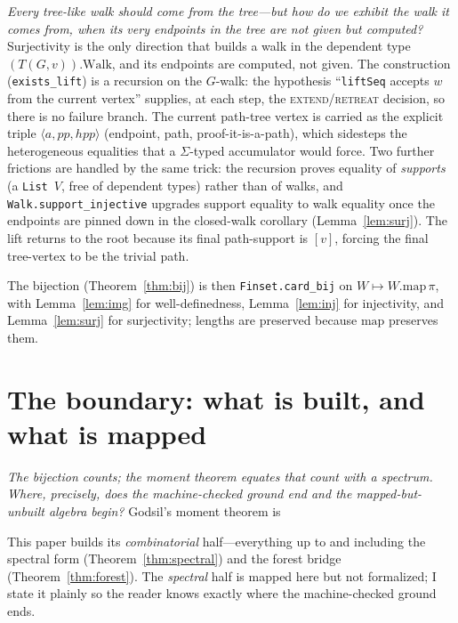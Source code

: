 \documentclass[11pt]{article}
\newcommand{\lean}[1]{\texttt{#1}}
\newcommand{\keyeq}[1]{\begin{center}\keybox{$\displaystyle #1$}\end{center}}
\begin{document}
\emph{Every tree-like walk should come from the tree---but how do we exhibit the walk it comes from,
when its very endpoints in the tree are not given but computed?} Surjectivity is the only direction
that builds a walk in the dependent type
$(T(G,v)).\mathrm{Walk}$, and its endpoints are computed, not given. The construction
(\lean{exists\_lift}) is a recursion on the $G$-walk: the hypothesis ``\lean{liftSeq} accepts $w$ from
the current vertex'' supplies, at each step, the \textsc{extend}/\textsc{retreat} decision, so there
is no failure branch. The current path-tree vertex is carried as the explicit triple
$\langle a, pp, hpp\rangle$ (endpoint, path, proof-it-is-a-path), which sidesteps the heterogeneous
equalities that a $\Sigma$-typed accumulator would force. Two further frictions are handled by the
same trick: the recursion proves equality of \emph{supports} (a \lean{List}~$V$, free of dependent
types) rather than of walks, and \lean{Walk.support\_injective} upgrades support equality to walk
equality once the endpoints are pinned down in the closed-walk corollary
(Lemma~\ref{lem:surj}). The lift returns to the root because its final path-support is $[v]$, forcing
the final tree-vertex to be the trivial path.

The bijection (Theorem~\ref{thm:bij}) is then \lean{Finset.card\_bij} on $W\mapsto W.\mathrm{map}\,\pi$,
with Lemma~\ref{lem:img} for well-definedness, Lemma~\ref{lem:inj} for injectivity, and
Lemma~\ref{lem:surj} for surjectivity; lengths are preserved because $\mathrm{map}$ preserves them.

\section{The boundary: what is built, and what is mapped}
\label{sec:boundary}

\emph{The bijection counts; the moment theorem equates that count with a spectrum. Where, precisely,
does the machine-checked ground end and the mapped-but-unbuilt algebra begin?} Godsil's moment theorem
is
\keyeq{p_k(G)\;=\;\sum_i\theta_i^{k}\;=\;\mathrm{treeLikeWalkCount}(G,k).}
This paper builds its \emph{combinatorial} half---everything up to and including the spectral form
(Theorem~\ref{thm:spectral}) and the forest bridge (Theorem~\ref{thm:forest}). The
\emph{spectral} half is mapped here but not formalized; I state it plainly so the reader knows
exactly where the machine-checked ground ends.
\end{document}
